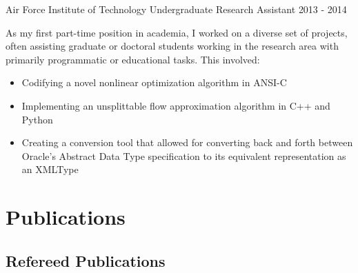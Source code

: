 \documentclass[11pt,a4paper,sans]{moderncv} %
\begin{document}
			 {Air Force Institute of Technology}
			 {Undergraduate Research Assistant}
			 {2013 - 2014}{}{\vspace{3pt}
As my first part-time position in academia, I worked on a diverse set of projects, often assisting graduate or doctoral students working in the research area with primarily programmatic or educational tasks. This involved: 
\begin{itemize}
	\item Codifying a novel nonlinear optimization algorithm in ANSI-C
	\item Implementing an unsplittable flow approximation algorithm in C++ and Python
	\item Creating a conversion tool that allowed for converting back and forth between Oracle's Abstract Data Type specification to its equivalent representation as an XMLType 
\end{itemize}	
}
\section{Publications}

\subsection{\Large Refereed Publications}






\end{document}
